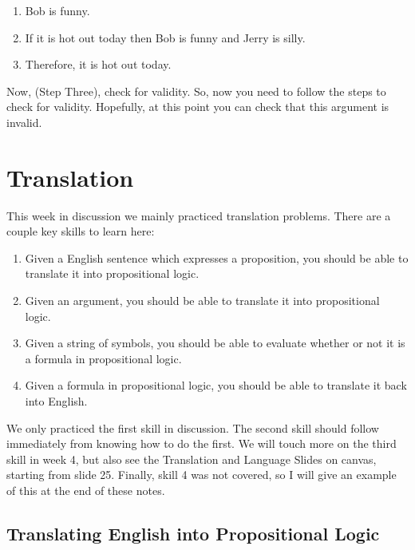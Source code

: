 \documentclass[
]{book}
\providecommand{\tightlist}{%
  \setlength{\itemsep}{0pt}\setlength{\parskip}{0pt}}
\begin{document}
\begin{enumerate}
\def\labelenumi{\arabic{enumi}.}
\tightlist
\item
  Bob is funny.
\item
  If it is hot out today then Bob is funny and Jerry is silly.
\item
  Therefore, it is hot out today.
\end{enumerate}

Now, (Step Three), check for validity. So, now you need to follow the steps to check for validity. Hopefully, at this point you can check that this argument is invalid.

\hypertarget{translation}{%
\chapter{Translation}\label{translation}}

This week in discussion we mainly practiced translation problems. There are a couple key skills to learn here:

\begin{enumerate}
\def\labelenumi{\arabic{enumi}.}
\tightlist
\item
  Given a English sentence which expresses a proposition, you should be able to translate it into propositional logic.
\item
  Given an argument, you should be able to translate it into propositional logic.
\item
  Given a string of symbols, you should be able to evaluate whether or not it is a formula in propositional logic.
\item
  Given a formula in propositional logic, you should be able to translate it back into English.
\end{enumerate}

We only practiced the first skill in discussion. The second skill should follow immediately from knowing how to do the first. We will touch more on the third skill in week 4, but also see the Translation and Language Slides on canvas, starting from slide 25. Finally, skill 4 was not covered, so I will give an example of this at the end of these notes.

\hypertarget{translating-english-into-propositional-logic}{%
\section{Translating English into Propositional Logic}\label{translating-english-into-propositional-logic}}
\end{document}
